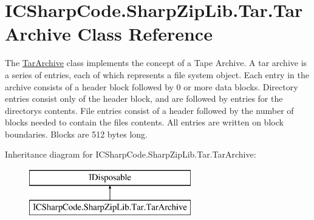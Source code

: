 \hypertarget{class_i_c_sharp_code_1_1_sharp_zip_lib_1_1_tar_1_1_tar_archive}{}\section{I\+C\+Sharp\+Code.\+Sharp\+Zip\+Lib.\+Tar.\+Tar\+Archive Class Reference}
\label{class_i_c_sharp_code_1_1_sharp_zip_lib_1_1_tar_1_1_tar_archive}


The \hyperlink{class_i_c_sharp_code_1_1_sharp_zip_lib_1_1_tar_1_1_tar_archive}{Tar\+Archive} class implements the concept of a \textquotesingle{}Tape Archive\textquotesingle{}. A tar archive is a series of entries, each of which represents a file system object. Each entry in the archive consists of a header block followed by 0 or more data blocks. Directory entries consist only of the header block, and are followed by entries for the directory\textquotesingle{}s contents. File entries consist of a header followed by the number of blocks needed to contain the file\textquotesingle{}s contents. All entries are written on block boundaries. Blocks are 512 bytes long.  


Inheritance diagram for I\+C\+Sharp\+Code.\+Sharp\+Zip\+Lib.\+Tar.\+Tar\+Archive\+:\begin{figure}[H]
\begin{center}
\leavevmode
\includegraphics[height=2.000000cm]{class_i_c_sharp_code_1_1_sharp_zip_lib_1_1_tar_1_1_tar_archive}
\end{center}
\end{figure}
